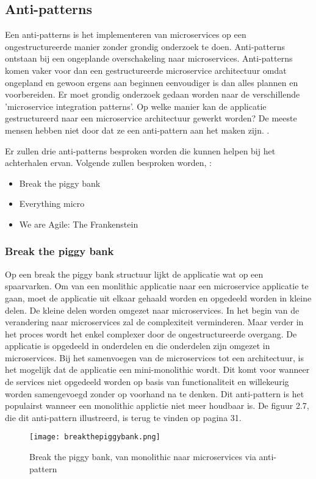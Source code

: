 \subsection{Anti-patterns}
Een anti-patterns is het implementeren van microservices op een ongestructureerde manier zonder grondig onderzoek te doen. 
Anti-patterns ontstaan bij een ongeplande overschakeling naar microservices.  Anti-patterns komen vaker voor dan een gestructureerde microservice architectuur omdat ongepland en gewoon ergens aan beginnen eenvoudiger is dan alles plannen en voorbereiden. Er moet grondig onderzoek gedaan worden naar de verschillende 'microservice integration patterns'. Op welke manier kan de applicatie gestructureerd naar een microservice architectuur gewerkt worden?
De meeste mensen hebben niet door dat ze een anti-pattern aan het maken zijn. . 

Er zullen drie anti-patterns besproken worden die kunnen helpen bij het achterhalen ervan. Volgende zullen besproken worden, \textcite{Monson2019}:
\begin{itemize}
	\item Break the piggy bank
	\item Everything micro
	\item We are Agile: The Frankenstein
\end{itemize}
\subsubsection{Break the piggy bank}
Op een break the piggy bank structuur lijkt de applicatie wat op een spaarvarken. Om van een monlithic applicatie naar een microservice applicatie te gaan, moet de applicatie uit elkaar gehaald worden en opgedeeld worden in kleine delen.  De kleine delen worden omgezet naar microservices. 
In het begin van de verandering naar microservices zal de complexiteit verminderen. Maar  verder in het proces wordt het enkel complexer door de ongestructureerde overgang.
De applicatie is opgedeeld in onderdelen en die onderdelen zijn omgezet in microservices. Bij het samenvoegen van de microservices tot een architectuur, is het mogelijk dat de applicatie een mini-monolithic wordt. Dit komt voor wanneer de services niet opgedeeld worden op basis van functionaliteit en willekeurig worden samengevoegd zonder op voorhand na te denken.
Dit anti-pattern is het populairst wanneer een monolithic applictie niet meer houdbaar is.
De figuur 2.7, die dit anti-pattern illustreerd, is terug te vinden op pagina 31.
\begin{figure}[h!]
	\texttt{[image: breakthepiggybank.png]}
	\centering
	\caption{Break the piggy bank, van monolithic naar microservices via anti-pattern \textcite{Monson2019}}
\end{figure}

